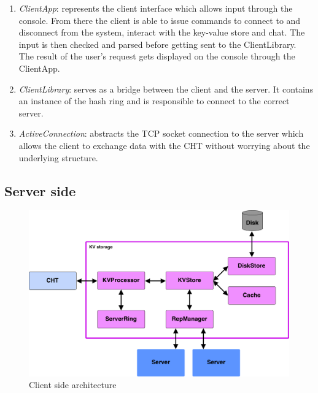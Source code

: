 \begin{enumerate} 
  \item \textit{ClientApp}: represents the client interface which allows input through the console. From there the client is able to issue commands to connect to and disconnect from the system, interact with the key-value store and chat. The input is then checked and parsed before getting sent to the ClientLibrary. The result of the user's request gets displayed on the console through the ClientApp.
  \item \textit{ClientLibrary}: serves as a bridge between the client and the server. It contains an instance of the hash ring and is responsible to connect to the correct server.
  \item \textit{ActiveConnection}: abstracts the TCP socket connection to the server which allows the client to exchange data with the CHT without worrying about the underlying structure.
\end{enumerate}
 
 
 
\subsection{Server side}

\begin{figure}[h]
	\centering
	\includegraphics[width=\linewidth]{figures/kvserver/kvs_arch.png}
	\caption{Client side architecture}
\end{figure}

